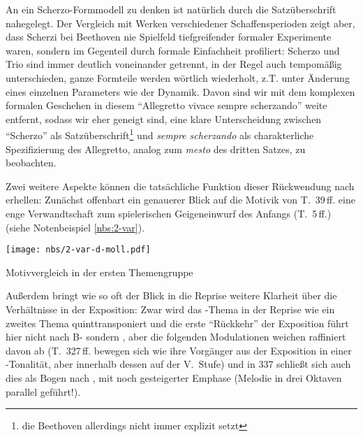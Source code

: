 An ein Scherzo-Formmodell zu denken ist natürlich durch die
Satzüberschrift nahegelegt.  Der Vergleich mit Werken verschiedener
Schaffensperioden zeigt aber, dass Scherzi bei Beethoven nie
Spielfeld tiefgreifender formaler Experimente waren, sondern im
Gegenteil durch formale Einfachheit profiliert:  Scherzo und Trio
sind immer deutlich voneinander getrennt, in der Regel auch tempomäßig
unterschieden, ganze Formteile werden wörtlich wiederholt, z.T.
unter Änderung eines einzelnen Parameters wie der Dynamik.  Davon
sind wir mit dem komplexen formalen Geschehen in diesem \enquote{Allegretto
vivace sempre scherzando} weite entfernt, sodass wir eher geneigt
sind, eine klare Unterscheidung zwischen \enquote{Scherzo} als
Satzüberschrift\footnote{die Beethoven allerdings nicht immer
explizit setzt} und \textit{sempre scherzando} als charakterliche
Spezifizierung des Allegretto\footnotemark, analog zum
\textit{mesto} des dritten Satzes, zu beobachten.

Zwei weitere Aspekte können die tatsächliche Funktion dieser
Rückwendung nach  erhellen:  Zunächst offenbart
ein genauerer Blick auf die Motivik von T.~39\,ff. eine enge
Verwandtschaft zum spielerischen Geigeneinwurf des Anfangs
(T.~5\,ff.) (siehe Notenbeispiel \vref{nbs:2-var}).
\begin{notenbeispiel}
 \texttt{[image: nbs/2-var-d-moll.pdf]}
 \caption{Motivvergleich in der ersten Themengruppe}
 \label{nbs:2-var}
\end{notenbeispiel}

Außerdem bringt wie so oft
der Blick in die Reprise weitere Klarheit über die Verhältnisse
in der Exposition: Zwar wird das -Thema in der Reprise wie
ein zweites Thema quinttransponiert und die erste \enquote{Rückkehr} der
Exposition führt hier nicht nach B- sondern , aber die folgenden
Modulationen weichen raffiniert davon ab (T.~327\,ff. bewegen sich
wie ihre Vorgänger aus der Exposition in einer -Tonalität,
aber innerhalb dessen auf der V.~Stufe) und in 337 schließt sich
auch dies als Bogen nach , mit noch gesteigerter
Emphase (Melodie in drei Oktaven parallel geführt!).

